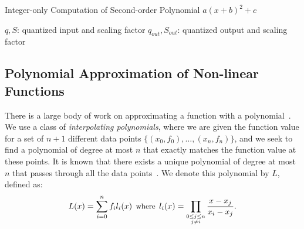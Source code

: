 
\begin{algorithm}[tb]
\caption{\footnotesize
   Integer-only Computation of Second-order Polynomial $a(x + b)^2 + c$}
\label{alg:intpoly}
\small
\begin{algorithmic}
 $q, S$: quantized input and scaling factor 
 $q_{out}, S_{out}$: quantized output and scaling factor
\vskip 0.075in
\ENDFUNCTION
\end{algorithmic}
\end{algorithm}


\subsection{\textbf{Polynomial Approximation of Non-linear Functions}}

There is a large body of work on approximating a function with a polynomial~\cite{stewart1996afternotes}.
We use a class of \textit{interpolating polynomials}, where we are given
the function value for a set of  $n+1$ different data points $\{(x_0, f_0),\dots, (x_n, f_n)\}$, and we seek
to find a polynomial of degree at most $n$ that exactly matches the function value at these points.
It is known that there exists a unique polynomial of degree at most $n$ that passes through all the data points~\cite{waring1779vii}.
We denote this polynomial by $L$, defined as:
\begin{equation}
\label{eqn:lagrange}
\small
L(x) = \sum_{i=0}^{n} f_i l_i(x) \enspace \text{\upshape where} \enspace 
l_i(x) = \prod_{\substack{0 \le j \le n \\ j \ne i}} \frac{x - x_j}{x_i - x_j}.
\end{equation}


